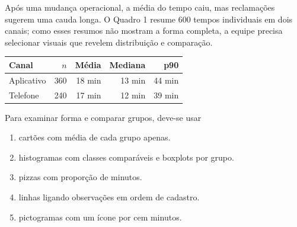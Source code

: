 \TextoBase Após uma mudança operacional, a média do tempo caiu, mas reclamações sugerem uma cauda longa. O Quadro 1 resume 600 tempos individuais em dois canais; como esses resumos não mostram a forma completa, a equipe precisa selecionar visuais que revelem distribuição e comparação.
\begin{DocumentBox}
\begin{tabularx}{\textwidth}{@{}Yrrrr@{}}\toprule
\textbf{Canal} & $n$ & \textbf{Média} & \textbf{Mediana} & \textbf{p90}\\\midrule
Aplicativo & 360 & 18 min & 13 min & 44 min\\
Telefone & 240 & 17 min & 12 min & 39 min\\\bottomrule
\end{tabularx}
\end{DocumentBox}
\FonteDidatica
\Comando Para examinar forma e comparar grupos, deve-se usar
\begin{enumerate}[label=\Alph*)]\item cartões com média de cada grupo apenas.\item histogramas com classes comparáveis e boxplots por grupo.\item pizzas com proporção de minutos.\item linhas ligando observações em ordem de cadastro.\item pictogramas com um ícone por cem minutos.\end{enumerate}

